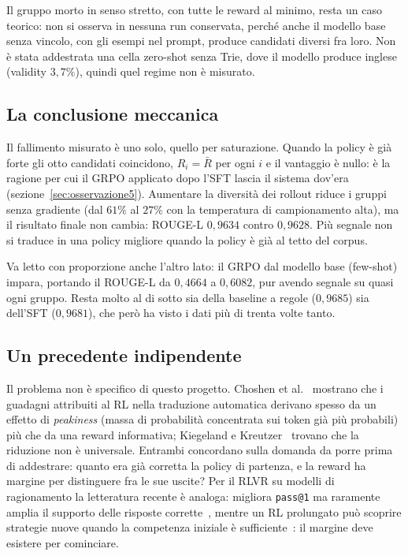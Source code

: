 Il gruppo morto in senso stretto, con tutte le reward al minimo, resta un caso
teorico: non si osserva in nessuna run conservata, perché anche il modello base
senza vincolo, con gli esempi nel prompt, produce candidati diversi fra loro. Non
è stata addestrata una cella zero-shot senza Trie, dove il modello produce
inglese (validity $3{,}7\%$), quindi quel regime non è misurato.

\subsection{La conclusione meccanica}

Il fallimento misurato è uno solo, quello per saturazione. Quando la policy è
già forte gli otto candidati coincidono, $R_i = \bar{R}$ per ogni $i$ e il
vantaggio è nullo: è la ragione per cui il GRPO applicato dopo l'SFT lascia il
sistema dov'era (sezione~\ref{sec:osservazione5}). Aumentare la diversità dei
rollout riduce i gruppi senza gradiente (dal $61\%$ al $27\%$ con la
temperatura di campionamento alta), ma il risultato finale non cambia: ROUGE-L
$0{,}9634$ contro $0{,}9628$. Più segnale non si traduce in una policy migliore
quando la policy è già al tetto del corpus.

Va letto con proporzione anche l'altro lato: il GRPO dal modello base
(few-shot) impara, portando il ROUGE-L da $0{,}4664$ a $0{,}6082$, pur avendo
segnale su quasi ogni gruppo. Resta molto al di sotto sia della baseline a
regole ($0{,}9685$) sia dell'SFT ($0{,}9681$), che però ha visto i dati più di
trenta volte tanto.

\subsection{Un precedente indipendente}

Il problema non è specifico di questo progetto. Choshen et
al.~\cite{choshen2020weaknesses} mostrano che i guadagni attribuiti al RL nella
traduzione automatica derivano spesso da un effetto di \emph{peakiness} (massa
di probabilità concentrata sui token già più probabili) più che da una reward
informativa; Kiegeland e Kreutzer~\cite{kiegeland2021revisiting} trovano che la
riduzione non è universale. Entrambi concordano sulla domanda da porre prima di
addestrare: quanto era già corretta la policy di partenza, e la reward ha margine
per distinguere fra le sue uscite? Per il RLVR su modelli di ragionamento la
letteratura recente è analoga: migliora \texttt{pass@1} ma raramente amplia il
supporto delle risposte corrette~\cite{wu2026invisibleleash,yue2025doesrl},
mentre un RL prolungato può scoprire strategie nuove quando la competenza
iniziale è sufficiente~\cite{liu2025prorl}: il margine deve esistere per
cominciare.
